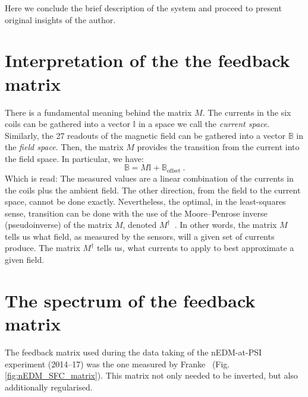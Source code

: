 Here we conclude the brief description of the system and proceed to present original insights of the author.



\section{Interpretation of the the feedback matrix}
There is a fundamental meaning behind the matrix $M$. The currents in the six coils can be gathered into a vector $\mathbb{I}$ in a space we call the \emph{current space}. Similarly, the 27 readouts of the magnetic field can be gathered into a vector $\mathbb{B}$ in the \emph{field space}. Then, the matrix $M$ provides the transition from the current into the field space. In particular, we have:
\begin{equation}
  \mathbb{B} = M \mathbb{I} + \mathbb{B}_\text{offset} \ .
\end{equation}
Which is read: The measured values are a linear combination of the currents in the coils plus the ambient field.
The other direction, from the field to the current space, cannot be done exactly. Nevertheless, the optimal, in the least-squares sense, transition can be done with the use of the Moore--Penrose inverse (pseudoinverse) of the matrix $M$, denoted $M^\dagger$~\cite{penrose_1955}.
In other words, the matrix $M$ tells us what field, as measured by the sensors, will a given set of currents produce. The matrix $M^\dagger$ tells us, what currents to apply to best approximate a given field.



\section{The spectrum of the feedback matrix}
\label{sec:nedm_sfc_matrix}
The feedback matrix used during the data taking of the nEDM-at-PSI experiment (2014--17) was the one measured by Franke~\cite{Franke2013} (Fig.\,\ref{fig:nEDM_SFC_matrix}). This matrix not only needed to be inverted, but also additionally regularised.

